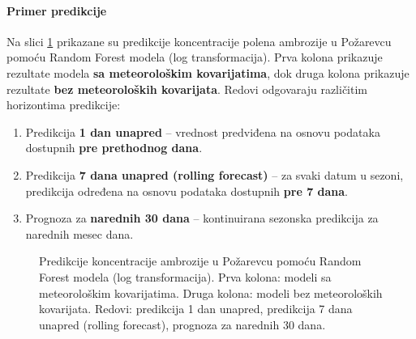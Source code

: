 \documentclass[12pt]{article}
\begin{document}
\paragraph{\textbf{Primer predikcije}}  
Na slici \ref{fig:rf_forecast_3x2} prikazane su predikcije koncentracije polena ambrozije u Požarevcu pomoću Random Forest modela (log transformacija).  
Prva kolona prikazuje rezultate modela \textbf{sa meteorološkim kovarijatima}, dok druga kolona prikazuje rezultate \textbf{bez meteoroloških kovarijata}.  
Redovi odgovaraju različitim horizontima predikcije:  
\begin{enumerate}
    \item Predikcija \textbf{1 dan unapred} – vrednost predviđena na osnovu podataka dostupnih \textbf{pre prethodnog dana}.
    \item Predikcija \textbf{7 dana unapred (rolling forecast)} – za svaki datum u sezoni, predikcija određena na osnovu podataka dostupnih \textbf{pre 7 dana}.
    \item Prognoza za \textbf{narednih 30 dana} – kontinuirana sezonska predikcija za narednih mesec dana.
\end{enumerate}

\begin{figure}[H]
    \centering



    \caption{Predikcije koncentracije ambrozije u Požarevcu pomoću Random Forest modela (log transformacija).  
    Prva kolona: modeli sa meteorološkim kovarijatima. Druga kolona: modeli bez meteoroloških kovarijata.  
    Redovi: predikcija 1 dan unapred, predikcija 7 dana unapred (rolling forecast), prognoza za narednih 30 dana.}
    \label{fig:rf_forecast_3x2}
\end{figure}
\end{document}
